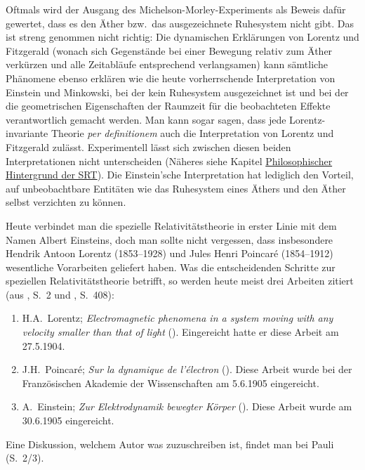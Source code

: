 Oftmals wird der Ausgang des Michelson-Morley-Experiments
als Beweis daf\"ur gewertet, dass es den \"Ather bzw.\
das ausgezeichnete Ruhesystem nicht gibt. Das ist
streng genommen nicht richtig: Die dynamischen
Erkl\"arungen von Lorentz und Fitzgerald (wonach
sich Gegenst\"ande bei einer Bewegung relativ zum
\"Ather verk\"urzen und alle Zeitabl\"aufe entsprechend
verlangsamen) kann s\"amtliche Ph\"anomene
ebenso erkl\"aren wie die heute vorherrschende
Interpretation von Einstein und Minkowski, bei der kein Ruhesystem ausgezeichnet ist und bei der
die geometrischen Eigenschaften der Raumzeit f\"ur die beobachteten Effekte verantwortlich
gemacht werden.
Man kann sogar sagen, dass jede
Lorentz-invariante Theorie \textit{per definitionem}
auch die Interpretation von Lorentz und Fitzgerald
zul\"asst. Experimentell l\"asst sich zwischen diesen
beiden Interpretationen nicht unterscheiden 
(N\"aheres siehe Kapitel \hyperref[chap_Philosophie-SRT]{Philosophischer Hintergrund der SRT}).
Die Einstein'sche Interpretation hat lediglich den
Vorteil, auf unbeobachtbare Entit\"aten wie das Ruhesystem eines \"Athers und den \"Ather selbst
verzichten zu k\"onnen.

Heute verbindet man die spezielle Relativit\"atstheorie in erster Linie
mit dem Namen Albert Einsteins, doch man sollte
nicht vergessen, dass insbesondere Hendrik Antoon
Lorentz (1853--1928) und Jules Henri Poincar\'e 
(1854--1912) wesentliche Vorarbeiten geliefert haben. Was die 
entscheidenden Schritte zur speziellen Relativit\"atstheorie betrifft, so werden
heute meist drei Arbeiten zitiert (aus \cite{Pauli}, S.~2 und 
\cite{Simonyi}, S.~408):
\begin{enumerate}
\item
H.A.\ Lorentz; {\it Electromagnetic phenomena in a system moving with
any velocity smaller than that of light} (\cite{Lorentz}). 
Eingereicht hatte er diese Arbeit am 27.5.1904.
\item
J.H.\ Poincar\'e; {\it Sur la dynamique de l'\'electron} (\cite{Poincare}).
Diese Arbeit wurde bei 
der Franz\"osischen Akademie der Wissenschaften am 5.6.1905 eingereicht.
\item 
A.\ Einstein; {\it Zur Elektrodynamik bewegter K\"orper} (\cite{Einstein1}).
Diese Arbeit wurde am 30.6.1905 eingereicht. 
\end{enumerate}

Eine Diskussion, welchem Autor was zuzuschreiben ist, findet man 
bei Pauli \cite{Pauli} (S.~2/3).  


